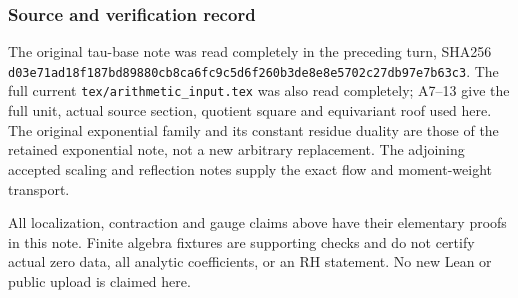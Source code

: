 \subsubsection{Source and verification record}\label{endpoint-f1_unit_gauge--source-and-verification-record}

The original tau-base note was read completely in the preceding turn, SHA256 \nolinkurl{d03e71ad18f187bd89880cb8ca6fc9c5d6f260b3de8e8e5702c27db97e7b63c3}. The full current \nolinkurl{tex/arithmetic_input.tex} was also read completely; A7--13 give the full unit, actual source section, quotient square and equivariant roof used here. The original exponential family and its constant residue duality are those of the retained exponential note, not a new arbitrary replacement. The adjoining accepted scaling and reflection notes supply the exact flow and moment-weight transport.

All localization, contraction and gauge claims above have their elementary proofs in this note. Finite algebra fixtures are supporting checks and do not certify actual zero data, all analytic coefficients, or an RH statement. No new Lean or public upload is claimed here.

\endgroup


\endgroup
